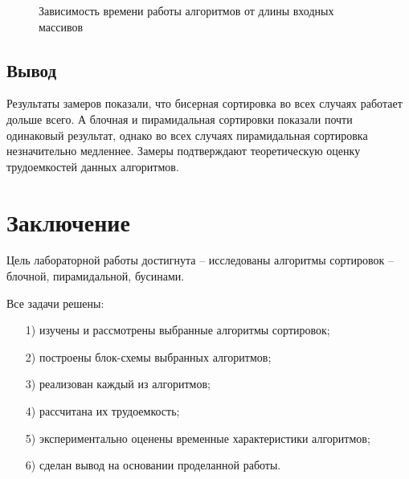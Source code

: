 \documentclass[a4paper,14pt, unknownkeysallowed]{extreport}
\begin{document}
\clearpage

\begin{center}
	\begin{figure}[h!]
	\center
	\caption{Зависимость времени работы алгоритмов от длины входных массивов}
	\label{ris_dec}
	\end{figure}
\end{center}
	
\section*{Вывод}
	
Результаты замеров показали, что бисерная сортировка во всех случаях работает дольше всего. А блочная и пирамидальная сортировки показали почти одинаковый результат, однако во всех случаях пирамидальная сортировка незначительно медленнее. Замеры подтверждают теоретическую оценку трудоемкостей данных алгоритмов.
	
\chapter*{Заключение}


Цель лабораторной работы достигнута -- исследованы алгоритмы сортировок -- блочной, пирамидальной, бусинами.  

Все задачи решены:
\begin{enumerate}
	\item[1)] изучены и рассмотрены выбранные алгоритмы сортировок;
	\item[2)] построены блок-схемы выбранных алгоритмов;
	\item[3)] реализован каждый из алгоритмов;
	\item[4)] рассчитана их трудоемкость;
	\item[5)] экспериментально оценены временные характеристики алгоритмов;
	\item[6)] сделан вывод на основании проделанной работы.
\end{enumerate}
	
\end{document}
